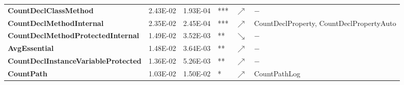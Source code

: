 \begin{table*}[t]
\begin{tabular}{|>{\bfseries}l|r|rl|c|l|}
CountDeclClassMethod                       & 2.43E-02 & 1.93E-04 & *** & $\nearrow$ &             $-$                                                                                                                                                                                                                                                                                                                                                     \\
CountDeclMethodInternal                    & 2.35E-02 & 2.45E-04 & *** & $\nearrow$ & CountDeclProperty, CountDeclPropertyAuto                                                                                                                                                                                                                                                                                                                        \\
CountDeclMethodProtectedInternal           & 1.49E-02 & 3.52E-03 & **  & $\searrow$ &         $-$                                                                                                                                                                                                                                                                                                                                                         \\
AvgEssential                               & 1.48E-02 & 3.64E-03 & **  & $\nearrow$ &   $-$                                                                                                                                                                                                                                                                                                                                                               \\
CountDeclInstanceVariableProtected         & 1.36E-02 & 5.26E-03 & **  & $\nearrow$ &   $-$                                                                                                                                                                                                                                                                                                                                                               \\
CountPath                                  & 1.03E-02 & 1.50E-02 & *   & $\nearrow$ & CountPathLog                                                                                                                                                                                                                                                                                                                                                    \\

\end{tabular}
\end{table*}
